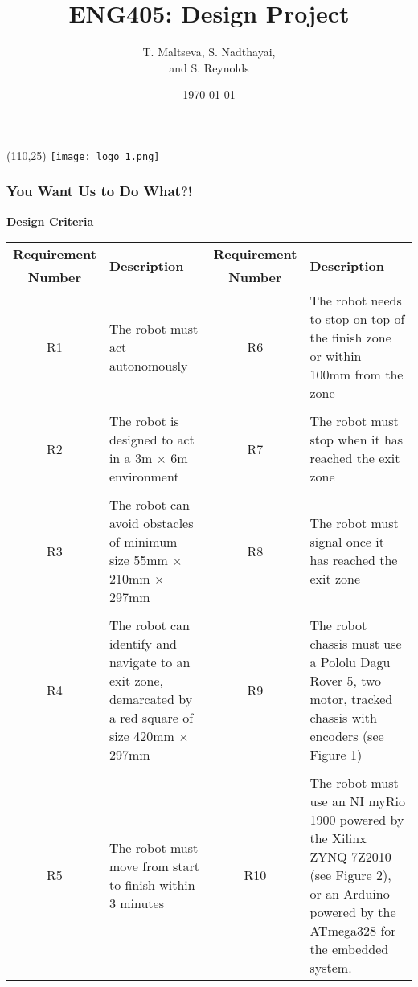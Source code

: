 \documentclass[aspectratio=169]{beamer}
\title[ENG405]{ENG405: Design Project} %
\author{\tiny T. Maltseva, S. Nadthayai,\\ and S. Reynolds} %
\institute[CDU] %
{
Charles Darwin University \\ %
\medskip
}
\date{\today} %
\begin{document}
\begin{frame}
\titlepage %
\begin{textblock}{20}(110,25)
      \texttt{[image: logo\_1.png]}
\end{textblock}
\end{frame}



\begin{frame}
\frametitle{You Want Us to Do What?!}
\textbf{Design Criteria}
\vspace{0.25cm}
\begin{table}[h]
\centering
\tiny
\begin{tabular}{cp{4cm}cp{4cm}}
\toprule
\textbf{Requirement} & \multirow{2}{*}{\textbf{Description}} & \textbf{Requirement} & \multirow{2}{*}{\textbf{Description}}\\
\textbf{Number} & & \textbf{Number} & \\
\midrule
R1 & The robot must act autonomously & R6 & The robot  needs to stop on top of the finish zone or within 100mm from the zone\\
 & & & \\
R2 & The robot is designed to act in a 3m $\times$ 6m environment & R7 & The robot must stop when it has reached the exit zone\\
 & & & \\
R3 & The robot can avoid obstacles of minimum size 55mm $\times$ 210mm $\times$ 297mm & R8 & The robot must signal once it has reached the exit zone\\
 & & & \\
R4 & The robot can identify and navigate to an exit zone, demarcated by a red square of size 420mm $\times$ 297mm & R9 & The robot chassis must use a Pololu Dagu Rover 5, two motor, tracked chassis with encoders (see Figure 1)\\
& & &\\
R5 & The robot must move from start to finish within 3 minutes & R10 & The robot must use an NI myRio 1900 powered by the Xilinx ZYNQ 7Z2010 (see Figure 2), or an Arduino powered by the ATmega328 for the embedded system.\\
\bottomrule
\end{tabular}
\end{table}
\end{frame}
\end{document}
